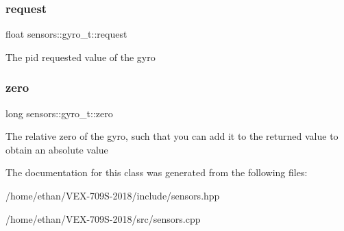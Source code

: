 \subsubsection{\texorpdfstring{request}{request}}
{\footnotesize\ttfamily float sensors\+::gyro\+\_\+t\+::request}

The pid requested value of the gyro \mbox{\label{classsensors_1_1gyro__t_ac66c52c31ee9cff57a88b514a9f99051}} 
\subsubsection{\texorpdfstring{zero}{zero}}
{\footnotesize\ttfamily long sensors\+::gyro\+\_\+t\+::zero}

The relative zero of the gyro, such that you can add it to the returned value to obtain an absolute value 

The documentation for this class was generated from the following files\+:\begin{DoxyCompactItemize}
\item 
/home/ethan/\+V\+E\+X-\/709\+S-\/2018/include/sensors.\+hpp\item 
/home/ethan/\+V\+E\+X-\/709\+S-\/2018/src/sensors.\+cpp\end{DoxyCompactItemize}

